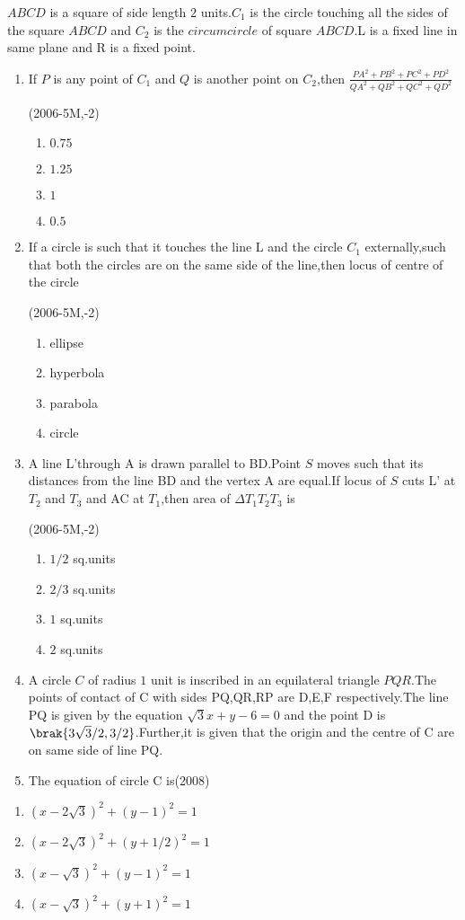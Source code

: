 \iffalse
  \title{Assignment 1}
  \author{Srihaas Gunda}
  \section{paragraph}
\fi



\item $ABCD$ is a square of side length $2$ units.$C_1$ is the circle touching all the sides of the square $ABCD$ and $C_2$ is the $circumcircle$ of square $ABCD$.L is a fixed line in same plane and R is a fixed point.\\
\begin{enumerate}
\item If $P$ is any point of $C_1$ and $Q$ is another point on $C_2$,then $\frac{PA^2+PB^2+PC^2+PD^2}{QA^2+QB^2+QC^2+QD^2}$

\hfill(2006-5M,-2)
\begin{enumerate}
\item $0.75$
\item $1.25$
\item $1$
\item $0.5$
\end{enumerate}
\item If a circle is such that it touches the line L and the circle $C_1$ externally,such that both the circles are on the same side of the line,then locus of centre of the circle 

\hfill(2006-5M,-2)
\begin{enumerate}
\item ellipse
\item hyperbola
\item parabola
\item circle
\end{enumerate}
\item A line L'through A is drawn parallel to BD.Point $S$ moves such that its distances from the line BD and the vertex A are equal.If locus of $S$ cuts L' at $T_2$ and $T_3$ and AC at $T_1$,then area of $\Delta T_1T_2T_3$ is

\hfill(2006-5M,-2)
\begin{enumerate}
\item $1/2$ sq.units
\item $2/3$ sq.units
\item $1$ sq.units
\item $2$ sq.units
\end{enumerate}

\item A circle $C$ of radius $1$ unit is inscribed in an equilateral triangle $PQR$.The points of contact of C with sides PQ,QR,RP are D,E,F respectively.The line PQ is given by the equation $\sqrt{3}x+y-6=0$ and the point D is $\brak{3\sqrt{3}/2 , 3/2}$.Further,it is given that the origin and the centre of C are on same side of line PQ.\\

\item The equation of circle C is\hfill(2008)
\end{enumerate}
\begin{enumerate}
\item $(x-2\sqrt{3})^2 + (y-1)^2=1$
\item $(x-2\sqrt{3})^2 + (y+1/2)^2=1$
\item $(x-\sqrt{3})^2 + (y-1)^2=1$
\item $(x-\sqrt{3})^2 + (y+1)^2=1$
\end{enumerate}

